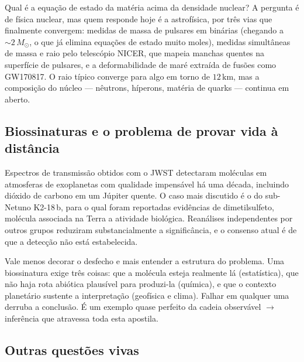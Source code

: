 \documentclass[11pt,a4paper]{article}
\begin{document}
Qual é a equação de estado da matéria acima da densidade nuclear? A pergunta é de física nuclear, mas quem responde hoje é a astrofísica, por três vias que finalmente convergem: medidas de massa de pulsares em binárias (chegando a $\sim2\,M_\odot$, o que já elimina equações de estado muito moles), medidas simultâneas de massa e raio pelo telescópio NICER, que mapeia manchas quentes na superfície de pulsares, e a deformabilidade de maré extraída de fusões como GW170817. O raio típico converge para algo em torno de $12\,\mathrm{km}$, mas a composição do núcleo --- nêutrons, híperons, matéria de quarks --- continua em aberto.

\subsection*{Biossinaturas e o problema de provar vida à distância}

Espectros de transmissão obtidos com o JWST detectaram moléculas em atmosferas de exoplanetas com qualidade impensável há uma década, incluindo dióxido de carbono em um Júpiter quente. O caso mais discutido é o do sub-Netuno K2-18\,b, para o qual foram reportadas evidências de dimetilsulfeto, molécula associada na Terra a atividade biológica. Reanálises independentes por outros grupos reduziram substancialmente a significância, e o consenso atual é de que a detecção não está estabelecida.

Vale menos decorar o desfecho e mais entender a estrutura do problema. Uma biossinatura exige três coisas: que a molécula esteja realmente lá (estatística), que não haja rota abiótica plausível para produzi-la (química), e que o contexto planetário sustente a interpretação (geofísica e clima). Falhar em qualquer uma derruba a conclusão. É um exemplo quase perfeito da cadeia observável $\rightarrow$ inferência que atravessa toda esta apostila.

\subsection*{Outras questões vivas}
\end{document}
